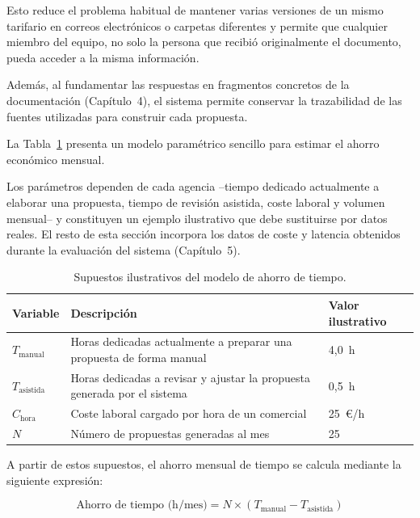 Esto reduce el problema habitual de mantener varias versiones de un mismo tarifario en
correos electrónicos o carpetas diferentes y permite que cualquier miembro del equipo,
no solo la persona que recibió originalmente el documento, pueda acceder a la misma
información.

Además, al fundamentar las respuestas en fragmentos concretos de la documentación
(Capítulo~4), el sistema permite conservar la trazabilidad de las fuentes utilizadas para
construir cada propuesta.


La Tabla~\ref{tab:roi-supuestos} presenta un modelo paramétrico sencillo para estimar el
ahorro económico mensual.

Los parámetros dependen de cada agencia --tiempo dedicado actualmente a elaborar una
propuesta, tiempo de revisión asistida, coste laboral y volumen mensual-- y constituyen
un ejemplo ilustrativo que debe sustituirse por datos reales. El resto de esta sección
incorpora los datos de coste y latencia obtenidos durante la evaluación del sistema
(Capítulo~5).

\begin{table}[h!]
\centering
\begin{tabular}{@{}p{2.2cm}p{8cm}p{3.5cm}@{}}
\toprule
\textbf{Variable}
&
\textbf{Descripción}
&
\textbf{Valor ilustrativo}
\\
\midrule

$T_{\text{manual}}$
&
Horas dedicadas actualmente a preparar una propuesta de forma manual
&
4,0~h
\\

$T_{\text{asistida}}$
&
Horas dedicadas a revisar y ajustar la propuesta generada por el sistema
&
0,5~h
\\

$C_{\text{hora}}$
&
Coste laboral cargado por hora de un comercial
&
25~€/h
\\

$N$
&
Número de propuestas generadas al mes
&
25
\\

\bottomrule
\end{tabular}
\caption{Supuestos ilustrativos del modelo de ahorro de tiempo.}
\label{tab:roi-supuestos}
\end{table}

A partir de estos supuestos, el ahorro mensual de tiempo se calcula mediante la siguiente
expresión:

\[
\text{Ahorro de tiempo (h/mes)}
=
N
\times
\left(
T_{\text{manual}}
-
T_{\text{asistida}}
\right)
\]

